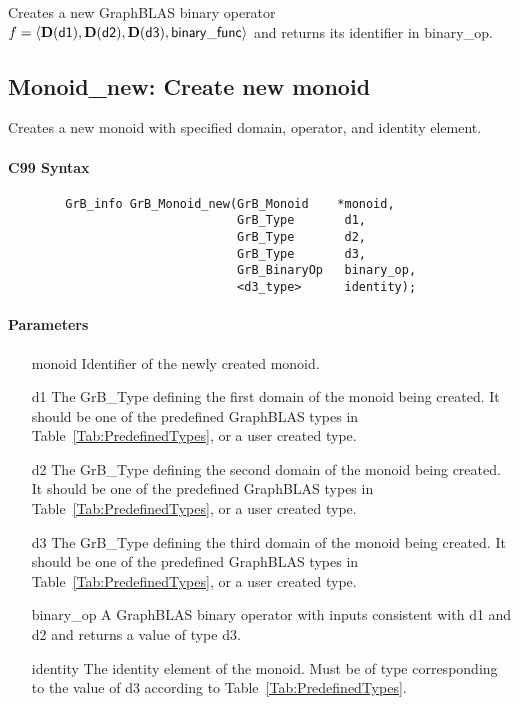 Creates a new GraphBLAS binary operator $f = \langle \bold{D}({\sf d1}), 
\bold{D}({\sf d2}), \bold{D}({\sf d3}), {\sf binary\_func} \rangle$ and returns its identifier in {\sf binary\_op}.




\subsection{{\sf Monoid\_new}: Create new monoid}

Creates a new monoid with specified domain, operator, and identity element.

\paragraph{C99 Syntax}

\begin{verbatim}
        GrB_info GrB_Monoid_new(GrB_Monoid    *monoid,
                                GrB_Type       d1,
                                GrB_Type       d2,
                                GrB_Type       d3,
                                GrB_BinaryOp   binary_op,
                                <d3_type>      identity);
\end{verbatim}

\paragraph{Parameters}

\begin{itemize}[leftmargin=1.1in]
    \item[{\sf monoid}]         Identifier of the newly created monoid.
    \item[{\sf d1}]     The {\sf GrB\_Type} defining the first domain of the monoid 
    being created. It should be one of the predefined GraphBLAS types in
    Table~\ref{Tab:PredefinedTypes}, or a user created type.
    \item[{\sf d2}]     The {\sf GrB\_Type} defining the second domain of the monoid
    being created.  It should be one of the predefined GraphBLAS types in
    Table~\ref{Tab:PredefinedTypes}, or a user created type.
    \item[{\sf d3}]      The {\sf GrB\_Type} defining the third domain of the monoid 
    being created.  It should be one of the predefined GraphBLAS types in
    Table~\ref{Tab:PredefinedTypes}, or a user created type.
    \item[{\sf binary\_op}]     A GraphBLAS binary operator with inputs consistent
    with {\sf d1} and {\sf d2} and returns a value of type {\sf d3}.
    \item[{\sf identity}]       The identity element of the monoid. 
    Must be of type corresponding to the value of {\sf d3} according to
    Table~\ref{Tab:PredefinedTypes}.
\end{itemize}

